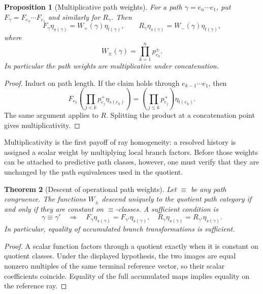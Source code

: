 \documentclass[11pt]{article}
\newtheorem{theorem}{Theorem}[section]
\newtheorem{proposition}[theorem]{Proposition}
\theoremstyle{definition}
\theoremstyle{remark}
\begin{document}
\begin{proposition}[Multiplicative path weights]
\label{prop:multiplicative-path-weights}
For a path $\gamma=e_n\cdots e_1$, put
$F_\gamma=F_{e_n}\cdots F_{e_1}$ and similarly for $R_\gamma$.  Then
\[
 F_\gamma\eta_{s(\gamma)}=W_+(\gamma)\eta_{t(\gamma)},
 \qquad
 R_\gamma\eta_{s(\gamma)}=W_-(\gamma)\eta_{t(\gamma)},
\]
where
\[
 \boxed{W_\pm(\gamma)=\prod_{k=1}^n p_{e_k}^\pm.}
\]
In particular the path weights are multiplicative under concatenation.
\end{proposition}

\begin{proof}
Induct on path length.  If the claim holds through $e_{k-1}\cdots e_1$, then
\[
 F_{e_k}\!
 \left(\prod_{j<k}p_{e_j}^+\eta_{s(e_k)}\right)
 =\left(\prod_{j\le k}p_{e_j}^+\right)\eta_{t(e_k)}.
\]
The same argument applies to $R$.  Splitting the product at a concatenation
point gives multiplicativity.
\end{proof}

Multiplicativity is the first payoff of ray homogeneity: a resolved history is
assigned a scalar weight by multiplying local branch factors.  Before those
weights can be attached to predictive path classes, however, one must verify that
they are unchanged by the path equivalences used in the quotient.

\begin{theorem}[Descent of operational path weights]
\label{thm:path-weight-descent}
Let $\equiv$ be any path congruence.  The functions $W_\pm$ descend uniquely to
the quotient path category if and only if they are constant on $\equiv$-classes.
A sufficient condition is
\[
 \gamma\equiv\gamma'
 \quad\Longrightarrow\quad
 F_\gamma\eta_{s(\gamma)}=F_{\gamma'}\eta_{s(\gamma)},
 \quad
 R_\gamma\eta_{s(\gamma)}=R_{\gamma'}\eta_{s(\gamma)}.
\]
In particular, equality of accumulated branch transformations is sufficient.
\end{theorem}

\begin{proof}
A scalar function factors through a quotient exactly when it is constant on
quotient classes.  Under the displayed hypothesis, the two images are equal
nonzero multiples of the same terminal reference vector, so their scalar
coefficients coincide.  Equality of the full accumulated maps implies equality
on the reference ray.
\end{proof}
\end{document}
